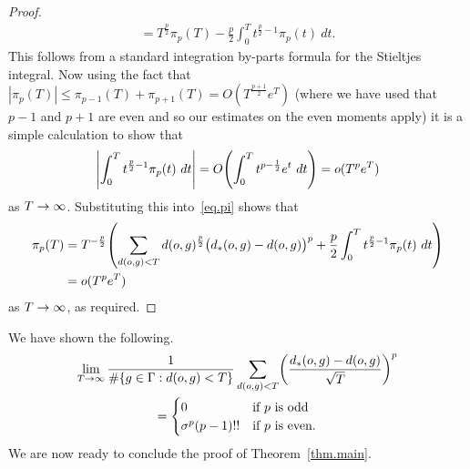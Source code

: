 \documentclass[10pt]{amsart}
\theoremstyle{definition}\newtheorem{defi}[theo]{Definition}\newtheorem{rema}[theo]{Remark}\newtheorem{exam}[theo]{Example}\newtheorem{exem}[theo]{Example}\newtheorem{nota}[theo]{Notation}
\newcommand{\G}{\Gamma}
\let\originalleft\left
\let\originalright\right
\renewcommand{\left}{\mathopen{}\mathclose\bgroup\originalleft}
\renewcommand{\right}{\aftergroup\egroup\originalright}
\renewcommand*{\to}{\mathchoice{\longrightarrow}{\rightarrow}{\rightarrow}{\rightarrow}}
\newcounter{setofcase}
\newcounter{case}[setofcase]
\theoremstyle{plain}
\begin{document}
\begin{proof}
\begin{multline}
= T^{\frac{p}{2}} \pi_p(T) - \frac{p}{2} \int_0^T t^{\frac{p}{2} -1} \pi_
p(t) \ dt.
\end{multline}
This follows from a standard integration by-parts formula for the Stieltjes integral. Now using the fact that $|\pi_p(T)| \le \pi_{p-1}(T) +\pi_{p+1}(T) = O(T^{\frac{p+1}{2}} e^T)$ (where we have used that $p-1$ and $p+1$ are even and so our estimates on the even moments apply) it is a simple calculation to show that
\[
\left| \int_0^T t^{\frac{p}{2} -1} \pi_p(t) \ dt \right| =O\left(\int_0^T t^{p -\frac{1}{2}} e^t \ dt\right) = o(T^{p} e^T)
\]
as $T \to\infty$. Substituting this into~\eqref{eq.pi} shows that
\begin{align*}
\pi_p(T) &= T^{-\frac{p}{2}}\left(\sum_{d(o,g) < T} d(o,g)^{\frac{p}{2}} \bigl(d_\ast(o,g) - d(o,g)\bigr)^p + \frac{p}{2} \int_0^T t^{\frac{p}{2} -1} \pi_p(t) \ dt
\right)\\
&= o(T^p e^T)
\end{align*}
as $T\to\infty$, as required.
\end{proof}



We have shown the following.
\begin{multline*}
\lim_{T\to\infty} \frac{1}{\#\{ g\in\G: d(o,g) < T\}} \sum_{d(o,g) < T} \left(\frac{d_\ast(o,g) - d(o,g)}{\sqrt{T}} \right)^p \\
=
\begin{cases}
0  &\text{if $p$ is odd} \\
\sigma^p (p-1)!!  &\text{if $p$ is even.}
\end{cases}
\end{multline*}
We are now ready to conclude the proof of Theorem~\ref{thm.main}.
\end{document}
